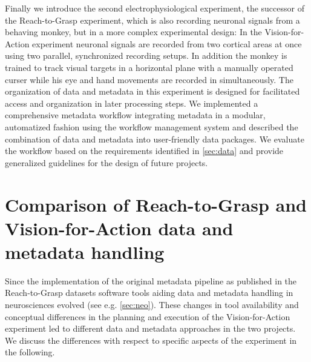 Finally we introduce the second electrophysiological experiment, the successor of the Reach-to-Grasp experiment, which is also recording neuronal signals from a behaving monkey, but in a more complex experimental design: In the Vision-for-Action experiment neuronal signals are recorded from two cortical areas at once using two parallel, synchronized recording setups. In addition the monkey is trained to track visual targets in a horizontal plane with a manually operated curser while his eye and hand movements are recorded in simultaneously. The organization of data and metadata in this experiment is designed for facilitated access and organization in later processing steps. We implemented a comprehensive metadata workflow integrating metadata in a modular, automatized fashion using the  workflow management system and described the combination of data and metadata into user-friendly data packages. We evaluate the workflow based on the requirements identified in \cref{sec:data} and provide generalized guidelines for the design of future projects.


\section{Comparison of Reach-to-Grasp and Vision-for-Action data and metadata handling}
Since the implementation of the original metadata pipeline as published in the Reach-to-Grasp datasets \citep{Brochier_2018} software tools aiding data and metadata handling in neurosciences evolved (see e.g. \cref{sec:neo}). These changes in tool availability and conceptual differences in the planning and execution of the Vision-for-Action experiment led to different data and metadata approaches in the two projects. We discuss the differences with respect to specific aspects of the experiment in the following.

